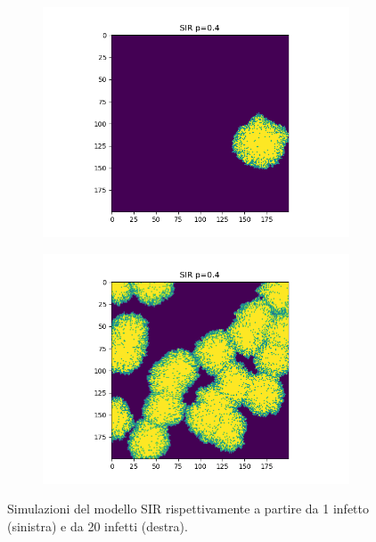 \documentclass{article}
\begin{document}
    \begin{figure}[H]
        \centering
        \begin{subfigure}[b]{0.49\linewidth}
         \centering
         \includegraphics[width=\linewidth]{../images/sir_image1}
     \end{subfigure}
        \hfill
        \begin{subfigure}[b]{0.49\linewidth}
         \centering
         \includegraphics[width=\linewidth]{../images/sir_image20}
     \end{subfigure}
     \caption{Simulazioni del modello SIR rispettivamente a partire da 1 infetto (sinistra) e da 20 infetti (destra).}
     \label{fig:sir_image}
    \end{figure}
\end{document}
